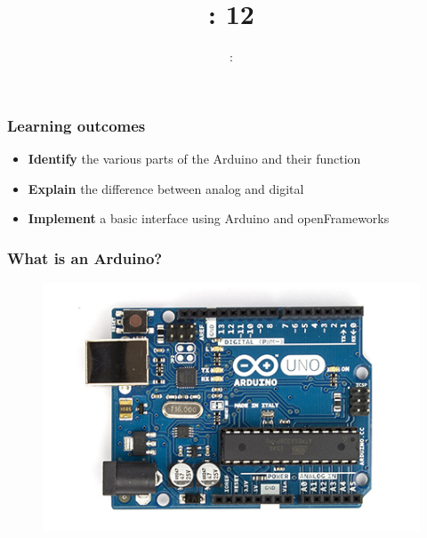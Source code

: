 \usepackage{../../beamerthemeFalmouthGamesAcademy}
\usepackage{multimedia}
\graphicspath{ {../../} }


\usepackage[normalem]{ulem}
\usepackage{wasysym}
\usepackage{listings}
\usepackage{pdfpages}

\usetikzlibrary{arrows,automata}




\title{\sessionnumber: 12}
\subtitle{\modulecode: \moduletitle}

\frame{\titlepage}

\begin{frame}
	\frametitle{Learning outcomes}
	\begin{itemize}
		\item \textbf{Identify} the various parts of the Arduino and their function
		\item \textbf{Explain} the difference between analog and digital
		\item \textbf{Implement} a basic interface using Arduino and openFrameworks
	\end{itemize}
\end{frame}


\begin{frame}
	\frametitle{What is an Arduino?}
	\begin{figure}
		\includegraphics[scale=1.2]{assets/arduino}  
	\end{figure}
\end{frame}


